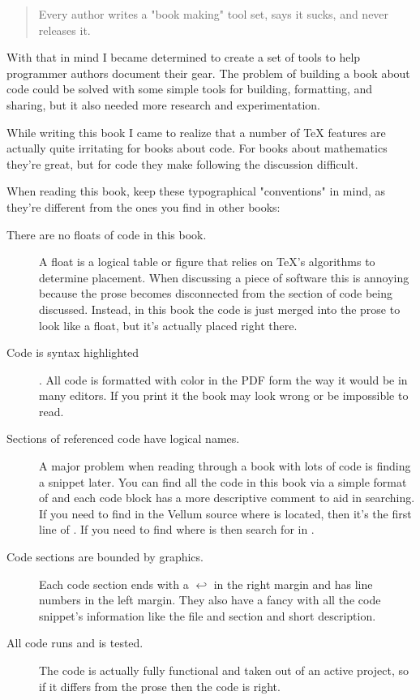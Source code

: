 \begin{quote}
Every author writes a "book making" tool set, says it sucks, and never releases it.
\end{quote}

With that in mind I became determined to create a set of tools to help
programmer authors document their gear.  The problem of building a book about
code could be solved with some simple tools for building, formatting, and
sharing, but it also needed more research and experimentation.

While writing this book I came to realize that a number of TeX features are
actually quite irritating for books about code.  For books about mathematics
they're great, but for code they make following the discussion difficult.

When reading this book, keep these typographical "conventions" in mind, as
they're different from the ones you find in other books:

\begin{description}
\item[There are no floats of code in this book.]  A float is a logical table or figure
that relies on TeX's algorithms to determine placement.  When discussing a piece
of software this is annoying because the prose becomes disconnected from the
section of code being discussed.  Instead, in this book the code is just merged
into the prose to look like a float, but it's actually placed right there.
\item[Code is syntax highlighted]. All code is formatted with color in the PDF
form the way it would be in many editors.  If you print it the book may look
wrong or be impossible to read.
\item[Sections of referenced code have logical names.] A major problem when
reading through a book with lots of code is finding a snippet later.  You can
find all the code in this book via a simple format of 
and each code block has a more descriptive comment to aid in searching.  If you
need to find in the Vellum source where  is located, then it's
the first line of .  If you need to find where
 is then search for  in
.
\item [Code sections are bounded by graphics.]  Each code section ends with a {$\hookleftarrow$} in the right margin and has line numbers in
the left margin.  They also have a fancy  with all the
code snippet's information like the file and section and short description.
\item [All code runs and is tested.] The code is actually fully functional and taken out of an active project,
    so if it differs from the prose then the code is right.
\end{description}


